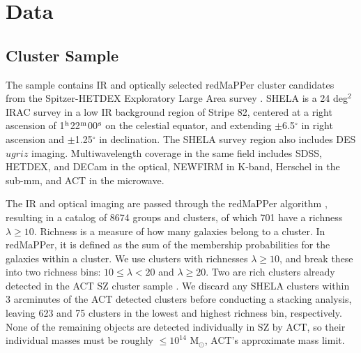 \documentclass[a4paper,fleqn,usenatbib]{mnras}
\begin{document}
\section{Data} \label{sec:data}

\subsection{Cluster Sample}
The sample contains IR and optically selected redMaPPer cluster candidates from the Spitzer-HETDEX Exploratory Large Area survey  \citep{2016ApJS..224...28P}. SHELA is a 24 deg$^2$ IRAC survey in a low IR background region of Stripe 82, centered at a right ascension of 1$^{\rm h}$22$^{\rm m}$00$^{\rm s}$ on the celestial equator, and extending $\pm$6.5$^{\circ}$ in right ascension and $\pm$1.25$^{\circ}$ in declination. The SHELA survey region also includes DES $ugriz$ imaging. Multiwavelength coverage in the same field includes SDSS, HETDEX, and DECam in the optical, NEWFIRM in K-band, Herschel in the sub-mm, and ACT in the microwave. 

The IR and optical imaging are passed through the redMaPPer algorithm \citep{2014ApJ...785..104R}, resulting in a catalog of 8674 groups and clusters, of which 701 have a richness $\lambda \geq 10.$ Richness is a measure of how many galaxies belong to a cluster. In redMaPPer, it is defined as the sum of the membership probabilities for the galaxies within a cluster. We use clusters with richnesses $\lambda \geq 10$, and break these into two richness bins: $10 \leq \lambda < 20$ and $\lambda \geq 20$. Two are rich clusters already detected in the ACT SZ cluster sample \citep{2013JCAP...07..008H}. We discard any SHELA clusters within 3 arcminutes of the ACT detected clusters before conducting a stacking analysis, leaving 623 and 75 clusters in the lowest and highest richness bin, respectively. None of the remaining objects are detected individually in SZ by ACT, so their individual masses must be roughly $\leq 10^{14}$ M$_\odot$, ACT's approximate mass limit.
\end{document}
